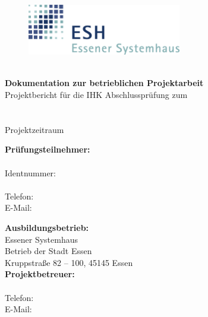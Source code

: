 \begin{titlepage}
    \centering\ \\
    \vspace{10mm}
    \begin{figure}[h]
        \centering
        \includegraphics[width=0.6\textwidth]{bilder/esh-logo.png}
    \end{figure}
    \vspace{15mm}
    {\LARGE\textbf{\dokumententitel}}\\
    \vspace{25mm}
    {\Large\textbf{Dokumentation zur betrieblichen Projektarbeit}}\\
    \vspace{10mm}
    {\large Projektbericht für die IHK Abschlussprüfung zum\\\ausbildungsberuf\\\ \\
        Projektzeitraum \projektzeitraum}\\
    \vfill
    \begin{minipage}{0.49\textwidth}
        \begin{flushleft}
            \textbf{Prüfungsteilnehmer:}\\
            \autorname\\
            Identnummer: \ptidentnummer\\
            \ptadresse\\
            Telefon: \pttelefon\\
            E-Mail: \ptemail
        \end{flushleft}
    \end{minipage}
    \begin{minipage}{0.49\textwidth}
        \begin{flushright}
            \textbf{Ausbildungsbetrieb:}\\
            Essener Systemhaus\\
            Betrieb der Stadt Essen\\
            Kruppstraße 82 -- 100, 45145 Essen\\
            \textbf{Projektbetreuer:}\\
            \pbname\\
            Telefon: \pbtelefon\\
            E-Mail: \pbemail
        \end{flushright}
    \end{minipage}
\end{titlepage}
